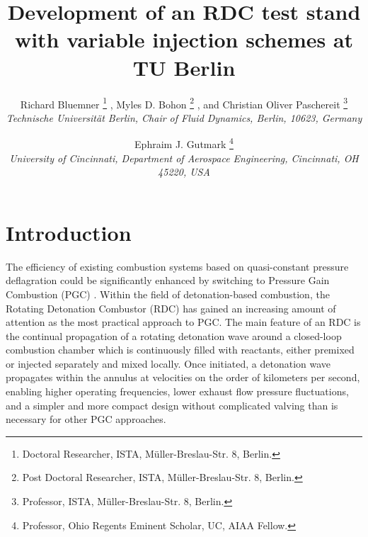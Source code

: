 \documentclass[]{aiaa-tc}%
\title{Development of an RDC test stand with variable injection schemes at TU Berlin}
\author{
  Richard Bluemner%
    \thanks{Doctoral Researcher, ISTA, Müller-Breslau-Str. 8, Berlin.}
  , Myles D. Bohon%
  	\thanks{Post Doctoral Researcher, ISTA, Müller-Breslau-Str. 8, Berlin.}
  , and Christian Oliver Paschereit%
  \thanks{Professor, ISTA, Müller-Breslau-Str. 8, Berlin.}\\
  {\normalsize\itshape
   Technische Universität Berlin, Chair of Fluid Dynamics, Berlin, 10623, Germany}
  \and
  Ephraim J. Gutmark%
   \thanks{Professor, Ohio Regents Eminent Scholar, UC, AIAA Fellow.}\\
  {\normalsize\itshape
  University of Cincinnati, Department of Aerospace Engineering, Cincinnati, OH 45220, USA}
 }
\begin{document}
\maketitle



\section{Introduction}
The efficiency of existing combustion systems based on quasi-constant pressure deflagration could be significantly enhanced by switching to Pressure Gain Combustion (PGC) \cite{Jones2013}. Within the field of detonation-based combustion, the Rotating Detonation Combustor (RDC) has gained an increasing amount of attention as the most practical approach to PGC. The main feature of an RDC is the continual propagation of a rotating detonation wave around a closed-loop combustion chamber which is continuously filled with reactants, either premixed or injected separately and mixed locally. Once initiated, a detonation wave propagates within the annulus at velocities on the order of kilometers per second, enabling higher operating frequencies, lower exhaust flow pressure fluctuations, and a simpler and more compact design without complicated valving than is necessary for other PGC approaches. 
\end{document}
